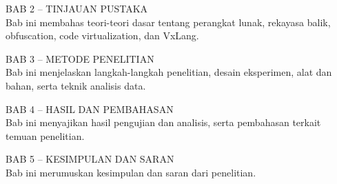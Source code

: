 BAB 2 – TINJAUAN PUSTAKA \\
Bab ini membahas teori-teori dasar tentang perangkat lunak, rekayasa balik, obfuscation, code virtualization, dan VxLang.

BAB 3 – METODE PENELITIAN \\
Bab ini menjelaskan langkah-langkah penelitian, desain eksperimen, alat dan bahan, serta teknik analisis data.

BAB 4 – HASIL DAN PEMBAHASAN \\
Bab ini menyajikan hasil pengujian dan analisis, serta pembahasan terkait temuan penelitian.

BAB 5 – KESIMPULAN DAN SARAN \\
Bab ini merumuskan kesimpulan dan saran dari penelitian.
